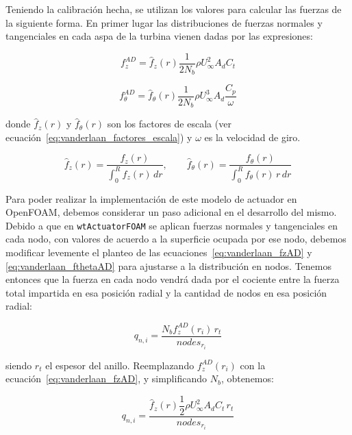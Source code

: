 Teniendo la calibración hecha, se utilizan los valores para calcular las fuerzas de la siguiente forma. En primer lugar las distribuciones de fuerzas normales y tangenciales en cada aspa de la turbina vienen dadas por las expresiones:

\begin{equation}
f_z^{AD} = \hat{f}_z(r) \frac{1}{2 N_b}\rho U_{\infty}^2 A_d C_t
\label{eq:vanderlaan_fzAD}
\end{equation}

\begin{equation}
f_\theta^{AD} = \hat{f}_\theta(r) \frac{1}{2 N_b}\rho U_{\infty}^3 A_d \frac{C_p}{\omega}
\label{eq:vanderlaan_fthetaAD}
\end{equation}

donde $\hat{f}_z(r)$ y $\hat{f}_\theta(r)$ son los factores de escala (ver ecuación~\ref{eq:vanderlaan_factores_escala}) y $\omega$ es la velocidad de giro.

\begin{equation}
\hat{f}_z(r) = \frac{f_z(r)}{\int_0^R f_z(r)\, dr}, \qquad
\hat{f}_\theta(r) = \frac{f_\theta(r)}{\int_0^R f_\theta(r)\, r\, dr}
\label{eq:vanderlaan_factores_escala}
\end{equation}

Para poder realizar la implementación de este modelo de actuador en OpenFOAM, debemos considerar un paso adicional en el desarrollo del mismo. Debido a que en \texttt{wtActuatorFOAM} se aplican fuerzas normales y tangenciales en cada nodo, con valores de acuerdo a la superficie ocupada por ese nodo, debemos modificar levemente el planteo de las ecuaciones~\ref{eq:vanderlaan_fzAD} y \ref{eq:vanderlaan_fthetaAD} para ajustarse a la distribución en nodos. Tenemos entonces que la fuerza en cada nodo vendrá dada por el cociente entre la fuerza total impartida en esa posición radial y la cantidad de nodos en esa posición radial:

\begin{equation}
q_{n,i} = \frac{N_b f_z^{AD}(r_i) \, r_t}{nodes_{r_i}}
\label{eq:vanderlaan_qn1}
\end{equation}

siendo $r_t$ el espesor del anillo. Reemplazando $f_z^{AD}(r_i)$ con la ecuación~\ref{eq:vanderlaan_fzAD}, y simplificando $N_b$, obtenemos:

\begin{equation}
q_{n,i} = \frac{\hat{f}_z(r) \dfrac{1}{2}\rho U_{\infty}^2 A_d C_t \, r_t}{nodes_{r_i}}
\label{eq:vanderlaan_qn2}
\end{equation}

